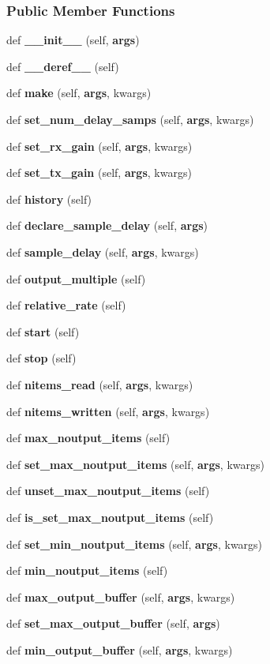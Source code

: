 \subsubsection*{Public Member Functions}
\begin{DoxyCompactItemize}
\item 
def {\bf \+\_\+\+\_\+init\+\_\+\+\_\+} (self, {\bf args})
\item 
def {\bf \+\_\+\+\_\+deref\+\_\+\+\_\+} (self)
\item 
def {\bf make} (self, {\bf args}, kwargs)
\item 
def {\bf set\+\_\+num\+\_\+delay\+\_\+samps} (self, {\bf args}, kwargs)
\item 
def {\bf set\+\_\+rx\+\_\+gain} (self, {\bf args}, kwargs)
\item 
def {\bf set\+\_\+tx\+\_\+gain} (self, {\bf args}, kwargs)
\item 
def {\bf history} (self)
\item 
def {\bf declare\+\_\+sample\+\_\+delay} (self, {\bf args})
\item 
def {\bf sample\+\_\+delay} (self, {\bf args}, kwargs)
\item 
def {\bf output\+\_\+multiple} (self)
\item 
def {\bf relative\+\_\+rate} (self)
\item 
def {\bf start} (self)
\item 
def {\bf stop} (self)
\item 
def {\bf nitems\+\_\+read} (self, {\bf args}, kwargs)
\item 
def {\bf nitems\+\_\+written} (self, {\bf args}, kwargs)
\item 
def {\bf max\+\_\+noutput\+\_\+items} (self)
\item 
def {\bf set\+\_\+max\+\_\+noutput\+\_\+items} (self, {\bf args}, kwargs)
\item 
def {\bf unset\+\_\+max\+\_\+noutput\+\_\+items} (self)
\item 
def {\bf is\+\_\+set\+\_\+max\+\_\+noutput\+\_\+items} (self)
\item 
def {\bf set\+\_\+min\+\_\+noutput\+\_\+items} (self, {\bf args}, kwargs)
\item 
def {\bf min\+\_\+noutput\+\_\+items} (self)
\item 
def {\bf max\+\_\+output\+\_\+buffer} (self, {\bf args}, kwargs)
\item 
def {\bf set\+\_\+max\+\_\+output\+\_\+buffer} (self, {\bf args})
\item 
def {\bf min\+\_\+output\+\_\+buffer} (self, {\bf args}, kwargs)

\end{DoxyCompactItemize}
